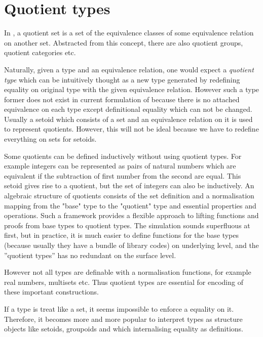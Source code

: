 
\section{Quotient types}

In \maths, a quotient set is a set of the equivalence classes of
some equivalence relation on another set. Abstracted from this
concept, there are also quotient groups, quotient categories etc.

Naturally, given a type and an equivalence relation, one would expect a \emph{quotient type}
which can be intuitively thought as a new type generated by redefining equality on original type with the given equivalence relation.
However such a type former does not exist in current formulation of \itt because there is no attached equivalence on each type except definitional equality which can not be changed. Usually a setoid which consists of a set and an equivalence relation on it is used to represent quotients. However, this will not be ideal because we have to redefine everything on sets for setoids.

Some quotients can be defined inductively without using quotient types. 
For example integers can be represented as pairs of natural numbers which are equivalent if the subtraction of first number from the second are equal.  This setoid gives rise to a quotient, but the set of integers can also be inductively. An algebraic structure of quotients consists of the set definition and a normalisation mapping from the "base" type to the "quotient" type and essential properties and operations. Such a framework provides a flexible approach to lifting functions and proofs from base types to quotient types. The simulation sounds superfluous at first, but in practice, it is much easier to define
functions for the base types (because usually they have a bundle of
library codes) on underlying level, and the ''quotient types'' has no
redundant on the surface level.

However not all types are definable with a normalisation functions, for example real numbers, multisets etc. Thus quotient types are essential for encoding of these important constructions.

If a type is treat like a set, it seems impossible to enforce a equality on it. Therefore, it becomes more and more popular to interpret types as structure objects like setoids, groupoids and \wog which internalising equality as definitions. 


